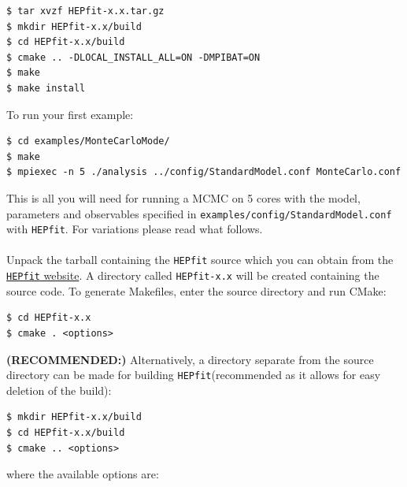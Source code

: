 \documentclass[preprint,3p,12pt]{elsarticle}
\newcommand{\HEPfit}{\texttt{HEPfit}\xspace}
\begin{document}
\begin{lstlisting}
$ tar xvzf HEPfit-x.x.tar.gz
$ mkdir HEPfit-x.x/build 
$ cd HEPfit-x.x/build 
$ cmake .. -DLOCAL_INSTALL_ALL=ON -DMPIBAT=ON
$ make
$ make install
\end{lstlisting}
To run your first example:
\begin{lstlisting} 
$ cd examples/MonteCarloMode/
$ make  
$ mpiexec -n 5 ./analysis ../config/StandardModel.conf MonteCarlo.conf
\end{lstlisting} 
This is all you will need for running a MCMC on 5 cores with the model, parameters and observables specified in \texttt{examples/config/StandardModel.conf} with \HEPfit. For variations please read what follows. \\\\
%
Unpack the tarball containing the \HEPfit source which you can obtain from the \href{http://hepfit.roma1.infn.it/}{\HEPfit website}. A directory called 
\texttt{HEPfit-x.x} will be created containing the source code. To generate 
Makefiles, enter the source directory and run CMake:

\begin{lstlisting}
$ cd HEPfit-x.x  
$ cmake . <options>  
\end{lstlisting}

{\bf (RECOMMENDED:)} Alternatively, a directory separate from the source directory can be made for
building \HEPfit (recommended as it allows for easy deletion of the build):
\begin{lstlisting}
$ mkdir HEPfit-x.x/build  
$ cd HEPfit-x.x/build  
$ cmake .. <options>  
\end{lstlisting}

where the available options are:
\end{document}

